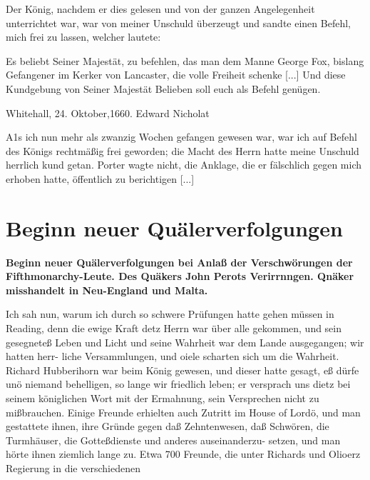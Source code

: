 Der König, nachdem er dies gelesen und von der ganzen
Angelegenheit unterrichtet war, war von meiner Unschuld überzeugt 
und sandte einen Befehl, mich frei zu lassen, welcher lautete:

\glqq Es beliebt Seiner Majestät, zu befehlen, das man dem Manne
George Fox, bislang Gefangener im Kerker von Lancaster, die
volle Freiheit schenke [...] Und diese Kundgebung von Seiner
Majestät Belieben soll euch als Befehl genügen.\grqq

\begin{flushright}Whitehall, 24. Oktober,1660. Edward Nicholat\end{flushright}

A1s ich nun mehr als zwanzig Wochen gefangen gewesen
war, war ich auf Befehl des Königs rechtmäßig frei geworden;
die Macht des Herrn hatte meine Unschuld herrlich kund getan.
Porter wagte nicht, die Anklage, die er fälschlich gegen mich
erhoben hatte, öffentlich zu berichtigen [...]

\chapter[Beginn neuer Quälerverfolgungen]{Beginn neuer Quälerverfolgungen}

\begin{center}
\textbf{Beginn neuer Quälerverfolgungen bei Anlaß der Verschwörungen
der Fifthmonarchy-Leute. Des Quäkers John Perots Verirrnngen.
Qnäker misshandelt in Neu-England und Malta.}
\end{center}


Ich sah nun, warum ich durch so schwere Prüfungen hatte
gehen müssen in Reading, denn die ewige Kraft detz Herrn war
über alle gekommen, und sein gesegneteß Leben und Licht und
seine Wahrheit war dem Lande ausgegangen; wir hatten herr-
liche Versammlungen, und oiele scharten sich um die Wahrheit.
Richard Hubberihorn war beim König gewesen, und dieser hatte
gesagt, eß dürfe unö niemand behelligen, so lange wir friedlich
leben; er versprach uns dietz bei seinem königlichen Wort mit der
Ermahnung, sein Versprechen nicht zu mißbrauchen. Einige
Freunde erhielten auch Zutritt im House of Lordö, und man
gestattete ihnen, ihre Gründe gegen daß Zehntenwesen, daß Schwören,
die Turmhäuser, die Gotteßdienste und anderes auseinanderzu-
setzen, und man hörte ihnen ziemlich lange zu. Etwa 700 Freunde,
die unter Richards und Olioerz Regierung in die verschiedenen


